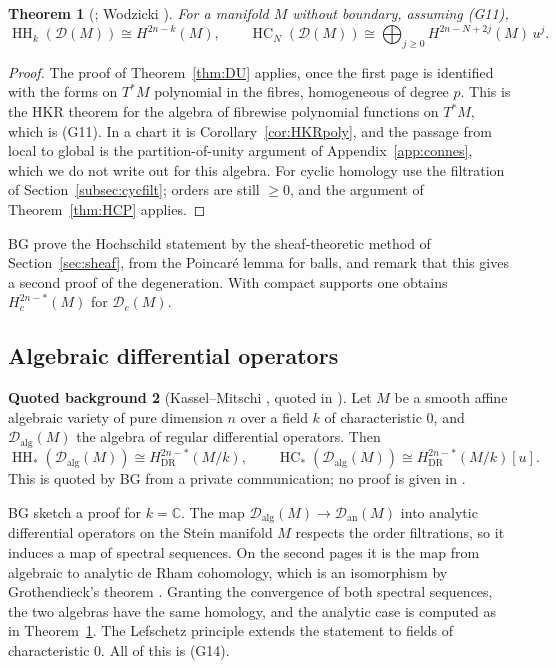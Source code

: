 \documentclass[11pt,oneside,reqno]{article}
\DeclareMathOperator{\HH}{HH}
\DeclareMathOperator{\HC}{HC}
\newcommand{\C}{\mathbb C}
\newcommand{\cD}{\mathcal D}
\theoremstyle{plain}
\newtheorem{theorem}{Theorem}[section]
\theoremstyle{definition}
\newtheorem{background}[theorem]{Quoted background}
\theoremstyle{remark}
\begin{document}
\begin{theorem}[{\cite[\S5]{BG}}; Wodzicki \cite{Wodzicki-cyclic}]\label{thm:DM}
For a manifold \(M\) without boundary, assuming (G11),
\[
 \HH_k(\cD(M))\cong H^{2n-k}(M),\qquad\HC_N(\cD(M))\cong\bigoplus_{j\ge0}H^{2n-N+2j}(M)\,u^j .
\]
\end{theorem}

\begin{proof}
The proof of Theorem~\ref{thm:DU} applies, once the first page is identified with
the forms on \(T^*M\) polynomial in the fibres, homogeneous of degree \(p\). This is the
HKR theorem for the algebra of fibrewise polynomial functions on \(T^*M\), which
is (G11). In a chart it is Corollary~\ref{cor:HKRpoly}, and the passage from local to
global is the partition-of-unity argument of Appendix~\ref{app:connes}, which we do
not write out for this algebra. For cyclic homology use the filtration of
Section~\ref{subsec:cycfilt}; orders are still \(\ge0\), and the argument of
Theorem~\ref{thm:HCP} applies.
\end{proof}

BG prove the Hochschild statement by the sheaf-theoretic method of
Section~\ref{sec:sheaf}, from the Poincaré lemma for balls, and remark that this
gives a second proof of the degeneration. With compact supports one obtains
\(H_c^{2n-*}(M)\) for \(\cD_c(M)\).

\subsection{Algebraic differential operators}\label{subsec:KM}

\begin{background}[Kassel--Mitschi {\cite{KasselMitschi}}, quoted in {\cite[\S5]{BG}}]
\label{bg:KM}
Let \(M\) be a smooth affine algebraic variety of pure dimension \(n\) over a field \(k\) of
characteristic \(0\), and \(\cD_{\mathrm{alg}}(M)\) the algebra of regular differential operators.
Then
\[
 \HH_*(\cD_{\mathrm{alg}}(M))\cong H^{2n-*}_{\mathrm{DR}}(M/k),\qquad
 \HC_*(\cD_{\mathrm{alg}}(M))\cong H^{2n-*}_{\mathrm{DR}}(M/k)[u].
\]
This is quoted by BG from a private communication; no proof is given in \cite{BG}.
\end{background}

BG sketch a proof for \(k=\C\). The map \(\cD_{\mathrm{alg}}(M)\to\cD_{\mathrm{an}}(M)\) into analytic
differential operators on the Stein manifold \(M\) respects the order filtrations, so
it induces a map of spectral sequences. On the second pages it is the map from
algebraic to analytic de Rham cohomology, which is an isomorphism by
Grothendieck's theorem \cite{Grothendieck}. Granting the convergence of both
spectral sequences, the two algebras have the same homology, and the analytic case
is computed as in Theorem~\ref{thm:DM}. The Lefschetz principle extends the
statement to fields of characteristic \(0\). All of this is (G14).
\end{document}
